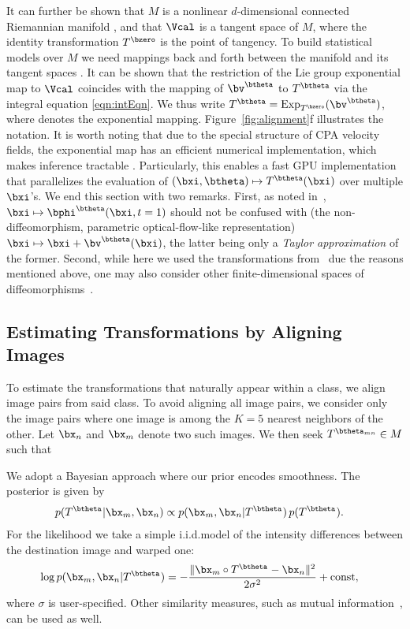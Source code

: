 \documentclass[twoside]{article}
\DeclareMathOperator{\Exp}{Exp}
\begin{document}
    It can further be shown that $M$ is a nonlinear
    $d$-dimensional connected Riemannian manifold \cite{freifeld2015transform},
    and that $\Vcal$ is a tangent space
    of $M$, where the identity transformation $T^{\bzero}$ is the point of
    tangency.    
    To build statistical models over $M$ we need mappings back and forth
    between the manifold and its tangent spaces \cite{pennec:jmiv:2006}.
    It can be shown that the restriction of the Lie group exponential map 
    to $\Vcal$ coincides with the mapping of $\bv^\btheta$ to $T^\btheta$ via
    the integral equation \eqref{eqn:intEqn}. 
    We 
    thus
    write $T^\btheta = \Exp_{T^{\bzero}} (\bv^\btheta)$,
    where 
    denotes the exponential mapping.
    Figure~\ref{fig:alignment}f illustrates the notation.
    It is worth noting that due to the special structure of CPA velocity fields, the exponential map has an efficient numerical
    implementation, which makes inference tractable \cite{freifeld2015transform}.
    Particularly, this enables a fast GPU implementation 
    that parallelizes the evaluation of $(\bxi,\btheta)\mapsto T^\btheta(\bxi)$  over multiple $\bxi$'s.
    We end this section with two remarks.
    First, as noted in~\cite{freifeld2015transform}, $\bxi\mapsto \phiThetaAt{\bxi}{t=1}$ should
    not be confused with (the non-diffeomorphism, parametric optical-flow-like representation) $\bxi\mapsto\bxi +\bv^\btheta(\bxi)$,
    the latter being only a \emph{Taylor approximation} of the former.
    Second, while here we used the transformations from~\cite{freifeld2015transform} due the reasons mentioned above,
    one may also consider other finite-dimensional spaces of diffeomorphisms~\cite{zhang:ipmi:2015,Arsigny:BIR:2006}. 
    
  \subsection{Estimating Transformations by Aligning Images}
    To estimate the transformations that naturally appear within a class, we
    align image pairs from said class. To avoid aligning all image pairs, we consider only the image pairs 
    where one image is among the $K=5$ nearest neighbors of the other.    
    Let $\bx_n$ and $\bx_m$ denote two such images. We then seek
    $T^{\btheta_{mn}} \in M$ such that  
    
        We adopt a Bayesian approach where our prior encodes
    smoothness. The posterior is given by  
    \begin{align}
      p(T^{\btheta_{}} | \bx_m, \bx_n)
        &\propto p( \bx_m, \bx_n | T^{\btheta_{}})\, p(T^{\btheta_{}}).
    \end{align}
    For the likelihood we take a simple i.i.d.\Gaussian model of the intensity
    differences between the destination image and warped one:
    \begin{align}
      \log p( \bx_m, \bx_n | T^{\btheta_{}})
       &= -\frac{\| \bx_m\circ T^{\btheta_{}} - \bx_n\|^2}{2\sigma^2} + \mathrm{const},
    \end{align}
    where $\sigma$ is user-specified. Other similarity measures,
    such as mutual information~\cite{viola1997alignment}, can be used as well.
\end{document}
